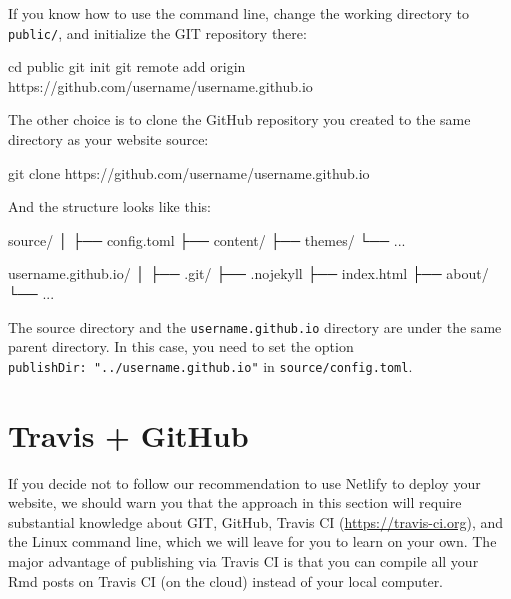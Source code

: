 \documentclass[12pt,]{krantz}
\makeatletter
\newenvironment{Shaded}{\begin{snugshade}}{\end{snugshade}}
\newcommand{\FunctionTok}[1]{\textcolor[rgb]{0.00,0.00,0.00}{#1}}
\newcommand{\BuiltInTok}[1]{#1}
\newcommand{\ExtensionTok}[1]{#1}
\newcommand{\NormalTok}[1]{#1}
\newenvironment{kframe}{%
\medskip{}
\setlength{\fboxsep}{.8em}
 \def\at@end@of@kframe{}%
 \ifinner\ifhmode%
  \def\at@end@of@kframe{\end{minipage}}%
  \begin{minipage}{\columnwidth}%
 \fi\fi%
 \def\FrameCommand##1{\hskip\@totalleftmargin \hskip-\fboxsep
 \colorbox{shadecolor}{##1}\hskip-\fboxsep
     \hskip-\linewidth \hskip-\@totalleftmargin \hskip\columnwidth}%
 \MakeFramed {\advance\hsize-\width
   \@totalleftmargin\z@ \linewidth\hsize
   \@setminipage}}%
 {\par\unskip\endMakeFramed%
 \at@end@of@kframe}
\renewenvironment{Shaded}{\begin{kframe}}{\end{kframe}}
\theoremstyle{definition}
\theoremstyle{definition}
\theoremstyle{definition}
\theoremstyle{remark}
\makeatother
\begin{document}
If you know how to use the command line, change the working directory to
\texttt{public/}, and initialize the GIT repository there:

\begin{Shaded}
\begin{Highlighting}[]
\BuiltInTok{cd}\NormalTok{ public}
\FunctionTok{git}\NormalTok{ init}
\FunctionTok{git}\NormalTok{ remote add origin https://github.com/username/username.github.io}
\end{Highlighting}
\end{Shaded}

The other choice is to clone the GitHub repository you created to the
same directory as your website source:

\begin{Shaded}
\begin{Highlighting}[]
\FunctionTok{git}\NormalTok{ clone https://github.com/username/username.github.io}
\end{Highlighting}
\end{Shaded}

And the structure looks like this:

\begin{Shaded}
\begin{Highlighting}[]
\ExtensionTok{source/}
\NormalTok{│}
\NormalTok{├── }\ExtensionTok{config.toml}
\NormalTok{├── }\ExtensionTok{content/}
\NormalTok{├── }\ExtensionTok{themes/}
\NormalTok{└── }\ExtensionTok{...}

\ExtensionTok{username.github.io/}
\NormalTok{│}
\NormalTok{├── }\ExtensionTok{.git/}
\NormalTok{├── }\ExtensionTok{.nojekyll}
\NormalTok{├── }\ExtensionTok{index.html}
\NormalTok{├── }\ExtensionTok{about/}
\NormalTok{└── }\ExtensionTok{...}
\end{Highlighting}
\end{Shaded}

The source directory and the \texttt{username.github.io} directory are
under the same parent directory. In this case, you need to set the
option \texttt{publishDir:\ "../username.github.io"} in
\texttt{source/config.toml}.

\section{Travis + GitHub}\label{travis-github}

If  you decide not to follow our recommendation to use
Netlify to deploy your website, we should warn you that the approach in
this section will require substantial knowledge about GIT, GitHub,
Travis CI (\url{https://travis-ci.org}), and the Linux command line,
which we will leave for you to learn on your own. The major advantage of
publishing via Travis CI is that you can compile all your Rmd posts on
Travis CI (on the cloud) instead of your local computer.
\end{document}
